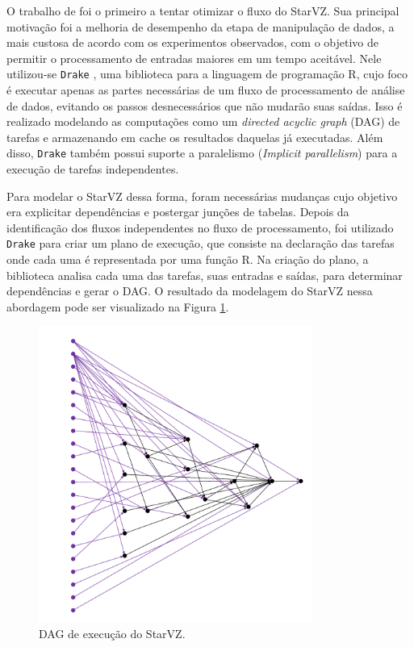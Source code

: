 O trabalho de \citet{ref:drakestarvz} foi o primeiro a tentar otimizar o fluxo 
do StarVZ. Sua principal motivação foi a melhoria de desempenho da etapa de 
manipulação de dados, a mais custosa de acordo com os experimentos observados, 
com o objetivo de permitir o processamento de entradas maiores em um tempo 
aceitável. Nele utilizou-se \texttt{Drake} \cite{ref:drake}, uma biblioteca 
para a linguagem de programação R, cujo foco é executar apenas as 
partes necessárias de um fluxo de processamento de análise de dados, evitando 
os passos desnecessários que não mudarão suas saídas. Isso é realizado 
modelando as computações como um \emph{directed acyclic graph} (DAG) de tarefas 
e armazenando em cache os resultados daquelas já executadas. Além disso, 
\texttt{Drake} também possui suporte a paralelismo (\emph{Implicit 
parallelism}) para a execução de tarefas independentes.

Para modelar o StarVZ dessa forma, foram necessárias mudanças cujo objetivo era 
explicitar 
dependências e postergar junções de tabelas. Depois da identificação 
dos fluxos independentes    
no fluxo de processamento, foi utilizado \texttt{Drake} para criar um plano de 
execução, que consiste na declaração
das tarefas onde cada uma é representada por uma função R. Na criação do plano, 
a biblioteca analisa cada
uma das tarefas, suas entradas e saídas, para determinar dependências e gerar o 
DAG. O resultado da modelagem do
StarVZ nessa abordagem pode ser visualizado na Figura \ref{fig:starvz-dag}.

\begin{figure}[ht]
\centerline{
\includegraphics[width=0.8\textwidth]{./img/drake-dag-final-origin.pdf}}
 \caption{DAG de execução do StarVZ.}
 \label{fig:starvz-dag}
\end{figure}

